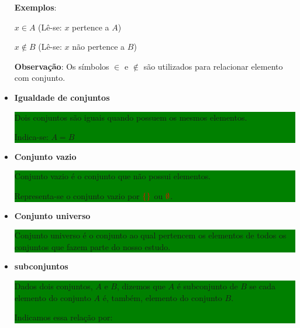 \documentclass[11pt, openright, a4paper, brazil, english, french, spanish, bibjustif, openany, oneside]{abntex2}
\begin{document}
\begin{SingleSpace}
\begin{itemize}
{\begin{minipage}{14.7cm}
\textbf{Exemplos}:

$x \in A$ (Lê-se: $x$ pertence a $A$)

$x \not\in B$ (Lê-se: $x$ não pertence a $B$) 

\end{minipage}
}

\textbf{Observação}: Os símbolos $\in$ e $\not\in$ são utilizados para relacionar elemento com conjunto.

\item \textbf{Igualdade de conjuntos}

\colorbox{green}
{
\begin{minipage}{14.7cm}

Dois conjuntos são iguais quando possuem os mesmos elementos.

Indica-se: $A=B$

\end{minipage}
}


\item \textbf{Conjunto vazio}

\colorbox{green}
{
\begin{minipage}{14.7cm}

Conjunto vazio é o conjunto que não possui elementos.

Representa-se o conjunto vazio por $\textcolor{red}{\{\}}$ ou $\textcolor{red}{\emptyset}$.


\end{minipage}
}


\item \textbf{Conjunto universo}

\colorbox{green}
{
\begin{minipage}{14.7cm}

Conjunto universo é o conjunto ao qual pertencem os elementos de todos os conjuntos que fazem parte do nosso estudo.

\end{minipage}
}

\item \textbf{subconjuntos}

\colorbox{green}
{
\begin{minipage}{14.7cm}

Dados dois conjuntos, $A$ e $B$, dizemos que $A$ é subconjunto de $B$ se cada elemento do conjunto $A$ é, também, elemento do conjunto $B$.

Indicamos essa relação por:

\begin{center}


\end{center}
\end{minipage}}
\end{itemize}
\end{SingleSpace}
\end{document}
